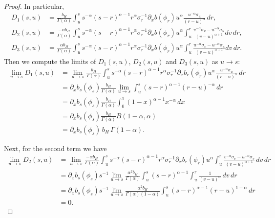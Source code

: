 \documentclass[preprint,12pt]{elsarticle}
\theoremstyle{definition}  %
\theoremstyle{plain}  %
\begin{document}
\begin{proof}
In particular,
\begin{align*}
	D_1(s,u) &= \frac{b_H}{\Gamma(\alpha)} 
	\int_u^s s^{-\alpha} (s-r)^{\alpha-1} r^{\alpha} 
	\sigma_r^{-1} \partial_x b(\phi_r) u^{\alpha} 
	\frac{u^{-\alpha}\sigma_u}{(r-u)^\alpha} \, dr, \\[6pt]
	D_2(s,u) &= \frac{-\alpha b_H}{\Gamma(\alpha)} 
	\int_u^s s^{-\alpha} (s-r)^{\alpha-1} r^{\alpha} 
	\sigma_r^{-1} \partial_x b(\phi_r) u^{\alpha} 
	\int_u^r \frac{v^{-\alpha}\sigma_v - u^{-\alpha}\sigma_u}{(v-u)^{\alpha+1}} dv \, dr, \\[6pt]
	D_3(s,u) &= \frac{\alpha b_H}{\Gamma(\alpha)} 
	\int_u^s s^{-\alpha} (s-r)^{\alpha-1} r^{\alpha} 
	\sigma_r^{-1} \partial_x b(\phi_r) u^{\alpha} 
	\int_u^r \frac{u^{-\alpha}\sigma_v - u^{-\alpha}\sigma_u}{(v-u)^{\alpha+1}} dv \, dr.
\end{align*}
Then we compute the limits of $D_1(s,u)$, $D_2(s,u)$ and $D_3(s,u)$ as $u \to s$:
\begin{align*}
	\lim_{u\to s} D_1(s,u)
	&= \lim_{u\to s} 
	\frac{b_H}{\Gamma(\alpha)}
	\int_u^s s^{-\alpha} (s-r)^{\alpha-1} r^{\alpha}
	\sigma_r^{-1} \partial_x b_r(\phi_r) u^{\alpha}
	\frac{u^{-\alpha}\sigma_u}{(r-u)^\alpha}\,dr \\
	&= \partial_x b_s(\phi_s)\frac{b_H}{\Gamma(\alpha)}
	\lim_{u\to s}\int_u^s (s-r)^{\alpha-1}(r-u)^{-\alpha}\,dr \\
	&= \partial_x b_s(\phi_s)\frac{b_H}{\Gamma(\alpha)}
	\int_0^1 (1-x)^{\alpha-1}x^{-\alpha}\,dx \\
	&= \partial_x b_s(\phi_s)\frac{b_H}{\Gamma(\alpha)}B(1-\alpha,\alpha) \\
	&= \partial_x b_s(\phi_s)\, b_H\,\Gamma(1-\alpha).
\end{align*}

Next, for the second term we have
\begin{align*}
	\lim_{u\to s} D_2(s,u)
	&= \lim_{u\to s}
	\frac{-\alpha b_H}{\Gamma(\alpha)}
	\int_u^s s^{-\alpha}(s-r)^{\alpha-1}r^{\alpha}
	\sigma_r^{-1}\partial_x b_r(\phi_r)u^{\alpha}
	\int_u^r \frac{v^{-\alpha}\sigma_v-u^{-\alpha}\sigma_v}{(v-u)^{\alpha+1}}\,dv\,dr \\
	&= \partial_x b_s(\phi_s)s^{-1}
	\lim_{u\to s}\frac{\alpha^2 b_H}{\Gamma(\alpha)}
	\int_u^s (s-r)^{\alpha-1}
	\int_u^r \frac{1}{(v-u)^{\alpha}}\,dv\,dr \\
	&= \partial_x b_s(\phi_s)s^{-1}
	\lim_{u\to s}\frac{\alpha^2 b_H}{\Gamma(\alpha)(1-\alpha)}
	\int_u^s (s-r)^{\alpha-1}(r-u)^{1-\alpha}\,dr \\
	&= 0.
\end{align*}


\end{proof}
\end{document}
